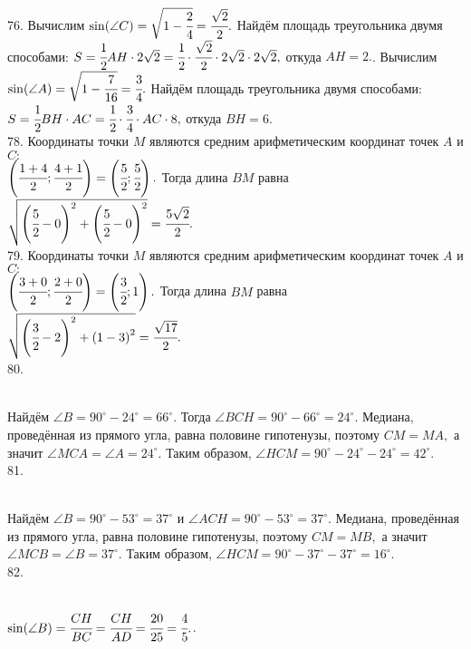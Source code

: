 76. Вычислим $\sin(\angle C)=\sqrt{1-\cfrac{2}{4}}=\cfrac{\sqrt{2}}{2}.$ Найдём площадь треугольника двумя способами: $S=\cfrac{1}{2}AH\cdot 2\sqrt{2}=\cfrac{1}{2}\cdot\cfrac{\sqrt{2}}{2}\cdot 2\sqrt{2}\cdot2\sqrt{2},$ откуда $AH=2.$\newpage{}. Вычислим $\sin(\angle A)=\sqrt{1-\cfrac{7}{16}}=\cfrac{3}{4}.$ Найдём площадь треугольника двумя способами: $S=\cfrac{1}{2}BH\cdot AC=\cfrac{1}{2}\cdot\cfrac{3}{4}\cdot AC\cdot8,$ откуда $BH=6.$\\
78. Координаты точки $M$ являются средним арифметическим координат точек $A$ и $C:$\\$ \left(\cfrac{1+4}{2}; \cfrac{4+1}{2}\right)=\left(\cfrac{5}{2};\cfrac{5}{2}\right).$ Тогда длина $BM$ равна $\sqrt{\left(\cfrac{5}{2}-0\right)^2+\left(\cfrac{5}{2}-0\right)^2}=\cfrac{5\sqrt{2}}{2}.$\\
79. Координаты точки $M$ являются средним арифметическим координат точек $A$ и $C:$\\$ \left(\cfrac{3+0}{2}; \cfrac{2+0}{2}\right)=\left(\cfrac{3}{2};1\right).$ Тогда длина $BM$ равна $\sqrt{\left(\cfrac{3}{2}-2\right)^2+\left(1-3\right)^2}=\cfrac{\sqrt{17}}{2}.$\\
80. \begin{figure}[ht!]
\end{figure}\\
Найдём $\angle B=90^\circ-24^\circ=66^\circ.$ Тогда $\angle BCH=90^\circ-66^\circ=24^\circ.$ Медиана, проведённая из прямого угла, равна половине гипотенузы, поэтому $CM=MA,$ а значит $\angle MCA=\angle A=24^\circ.$ Таким образом, $\angle HCM=90^\circ-24^\circ-24^\circ=42^\circ.$\\
81. \begin{figure}[ht!]
\end{figure}\\
Найдём $\angle B=90^\circ-53^\circ=37^\circ$ и $\angle ACH=90^\circ-53^\circ=37^\circ.$ Медиана, проведённая из прямого угла, равна половине гипотенузы, поэтому $CM=MB,$ а значит $\angle MCB=\angle B=37^\circ.$ Таким образом, $\angle HCM=90^\circ-37^\circ-37^\circ=16^\circ.$\\
82. \begin{figure}[ht!]
\end{figure}\\
$\sin(\angle B)=\cfrac{CH}{BC}=\cfrac{CH}{AD}=\cfrac{20}{25}=\cfrac{4}{5}.$\newpage{}. \begin{figure}[ht!]
\end{figure}\\
